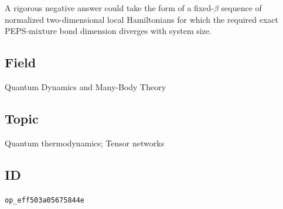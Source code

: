 A rigorous negative answer could take the form of a fixed-$\beta$ sequence of normalized two-dimensional local Hamiltonians for which the required exact PEPS-mixture bond dimension diverges with system size.

\subsection*{Field}

Quantum Dynamics and Many-Body Theory

\subsection*{Topic}

Quantum thermodynamics; Tensor networks

\subsection*{ID}

\texttt{op\_eff503a05675844e}
